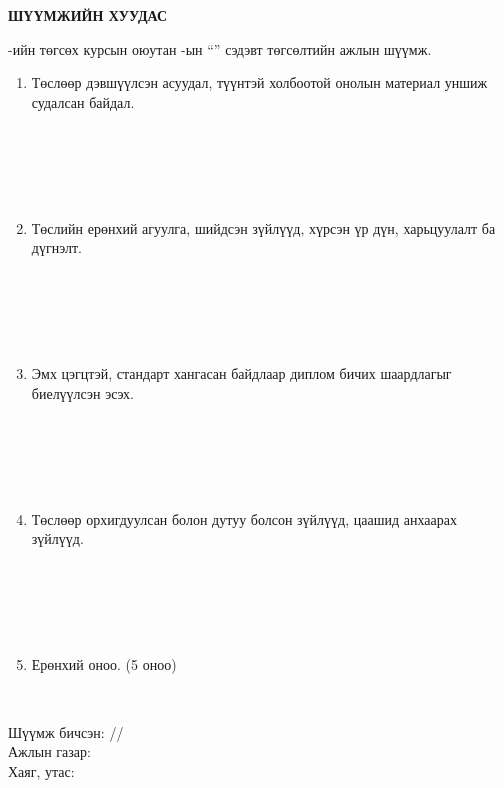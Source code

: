 \documentclass[
12pt,
oneside,
english,
onehalfspacing,
nolistspacing,
headsepline,
]{MUST-Thesis}
\begin{document}
\begin{titlepage}
    \begin{center}
        {\scshape\Large \univname\par}
        {\scshape\large \facname\par}\vspace{1cm}
        \textbf{\Large ШҮҮМЖИЙН ХУУДАС}\\[1cm]
    \end{center}

    \normalsize
    \deptname-ийн төгсөх курсын оюутан \shortname-ын ``\ttitle'' сэдэвт төгсөлтийн ажлын шүүмж.

    \begin{enumerate}
        \item Төслөөр дэвшүүлсэн асуудал, түүнтэй холбоотой онолын материал уншиж судалсан байдал.
        \begin{center}
            \dotfill \\[0.1cm]\dotfill \\[0.1cm]\dotfill \\[0.1cm]\dotfill \\[0.4cm]
        \end{center}
        \item Төслийн ерөнхий агуулга, шийдсэн зүйлүүд, хүрсэн үр дүн, харьцуулалт ба дүгнэлт.
        \begin{center}
            \dotfill \\[0.1cm]\dotfill \\[0.1cm]\dotfill \\[0.1cm]\dotfill \\[0.4cm]
        \end{center}
        \item Эмх цэгцтэй, стандарт хангасан байдлаар диплом бичих шаардлагыг биелүүлсэн эсэх.
        \begin{center}
            \dotfill \\[0.1cm]\dotfill \\[0.1cm]\dotfill \\[0.1cm]\dotfill \\[0.4cm]
        \end{center}
        \item Төслөөр орхигдуулсан болон дутуу болсон зүйлүүд, цаашид анхаарах зүйлүүд.
        \begin{center}
            \dotfill \\[0.1cm]\dotfill \\[0.1cm]\dotfill \\[0.1cm]\dotfill \\[0.4cm]
        \end{center}
        \item Ерөнхий оноо. (5 оноо)
        \begin{center}
            \dotfill \\[0.8cm]
        \end{center}
    \end{enumerate}
    Шүүмж бичсэн: \makebox[3cm]{\dotfill} /\readname/ \\[0.5cm]
    Ажлын газар: \dotfill \\[0.5cm]
    Хаяг, утас: \makebox[5cm]{\dotfill}
\end{titlepage}
\end{document}

